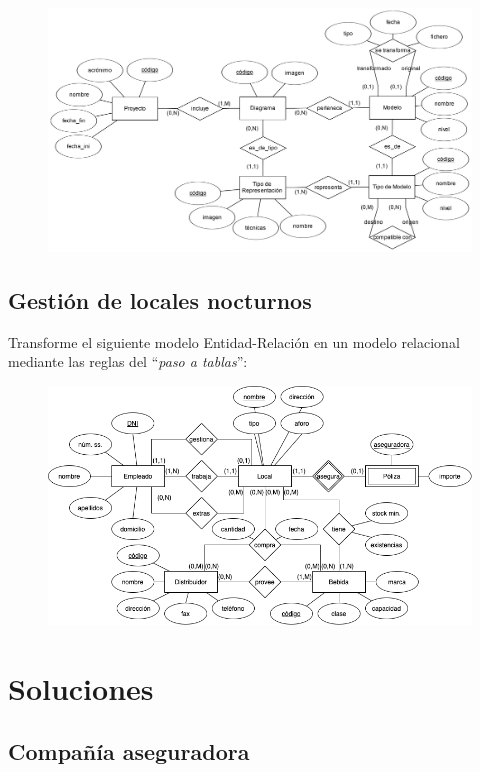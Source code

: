 \documentclass{db-practice}
\begin{document}
\begin{figure}[H]
    \centering
    \includegraphics[width=\textwidth]{figs/paso-a-tablas/desarrollo-dirigido-por-modelos}
\end{figure}

\subsection{Gestión de locales nocturnos}

Transforme el siguiente modelo Entidad-Relación en un modelo relacional mediante las reglas del ``\textit{paso a tablas}'':

\begin{figure}[H]
    \centering
    \includegraphics[width=\textwidth]{figs/paso-a-tablas/gestion-locales-nocturnos}
\end{figure}

\section{Soluciones}

\subsection{Compañía aseguradora}
\end{document}
